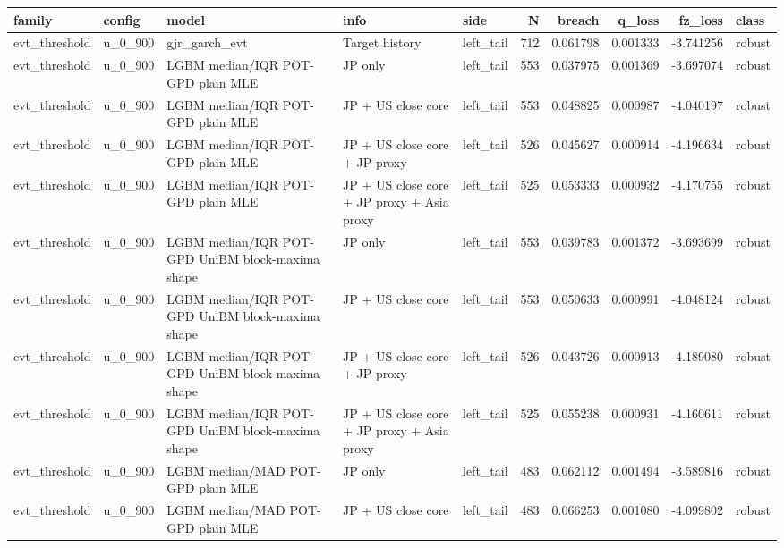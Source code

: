 \begin{tabular}{lll l lrrrrl}
\toprule
family & config & model & info & side & N & breach & q_loss & fz_loss & class \\
\midrule
evt\_threshold & u\_0\_900 & gjr\_garch\_evt & Target history & left\_tail & 712 & 0.061798 & 0.001333 & -3.741256 & robust \\
evt\_threshold & u\_0\_900 & LGBM median/IQR POT-GPD plain MLE & JP only & left\_tail & 553 & 0.037975 & 0.001369 & -3.697074 & robust \\
evt\_threshold & u\_0\_900 & LGBM median/IQR POT-GPD plain MLE & JP + US close core & left\_tail & 553 & 0.048825 & 0.000987 & -4.040197 & robust \\
evt\_threshold & u\_0\_900 & LGBM median/IQR POT-GPD plain MLE & JP + US close core + JP proxy & left\_tail & 526 & 0.045627 & 0.000914 & -4.196634 & robust \\
evt\_threshold & u\_0\_900 & LGBM median/IQR POT-GPD plain MLE & JP + US close core + JP proxy + Asia proxy & left\_tail & 525 & 0.053333 & 0.000932 & -4.170755 & robust \\
evt\_threshold & u\_0\_900 & LGBM median/IQR POT-GPD UniBM block-maxima shape & JP only & left\_tail & 553 & 0.039783 & 0.001372 & -3.693699 & robust \\
evt\_threshold & u\_0\_900 & LGBM median/IQR POT-GPD UniBM block-maxima shape & JP + US close core & left\_tail & 553 & 0.050633 & 0.000991 & -4.048124 & robust \\
evt\_threshold & u\_0\_900 & LGBM median/IQR POT-GPD UniBM block-maxima shape & JP + US close core + JP proxy & left\_tail & 526 & 0.043726 & 0.000913 & -4.189080 & robust \\
evt\_threshold & u\_0\_900 & LGBM median/IQR POT-GPD UniBM block-maxima shape & JP + US close core + JP proxy + Asia proxy & left\_tail & 525 & 0.055238 & 0.000931 & -4.160611 & robust \\
evt\_threshold & u\_0\_900 & LGBM median/MAD POT-GPD plain MLE & JP only & left\_tail & 483 & 0.062112 & 0.001494 & -3.589816 & robust \\
evt\_threshold & u\_0\_900 & LGBM median/MAD POT-GPD plain MLE & JP + US close core & left\_tail & 483 & 0.066253 & 0.001080 & -4.099802 & robust \\

\end{tabular}
